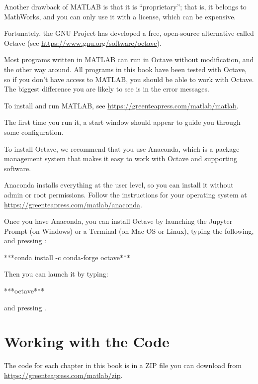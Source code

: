 Another drawback of MATLAB is that it is ``proprietary''; that is, it belongs to MathWorks, and you can only use it with a license, which can be expensive.

Fortunately, the GNU Project has developed a free, open-source alternative called Octave (see \url{https://www.gnu.org/software/octave}).  

Most programs written in MATLAB can run in Octave without modification, and the other way around.  All programs in this book have been tested with Octave, so if you don't have access to MATLAB, you should be able to work with Octave.  The biggest difference you are likely to see is in the error messages.

To install and run MATLAB, see \url{https://greenteapress.com/matlab/matlab}.

The first time you run it, a start window should appear to guide you through some configuration.

To install Octave, we recommend that you use Anaconda, which is a package management system that makes it easy to work with Octave and supporting software.

Anaconda installs everything at the user level, so you can install it without admin or root permissions.  Follow the instructions for your operating system at \url{https://greenteapress.com/matlab/anaconda}.

Once you have Anaconda, you can install Octave by launching the Jupyter Prompt (on Windows) or a Terminal (on Mac OS or Linux), typing the following, and pressing :

\begin{code}
***conda install -c conda-forge octave***
\end{code}

Then you can launch it by typing:

\begin{code}
***octave***
\end{code}

and pressing .

\section{Working with the Code}


The code for each chapter in this book is in a ZIP file you can download from \url{https://greenteapress.com/matlab/zip}.

